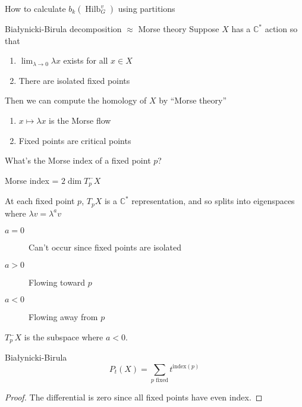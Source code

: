 \documentclass{beamer}
\DeclareMathOperator{\Hilb}{Hilb}
\newcommand{\C}{\mathbb{C}}
\begin{document}
\begin{frame}[plain,c]

\begin{center}

\Huge

How to calculate $b_k(\Hilb^v_G)$ using partitions

\end{center}

\end{frame}





\begin{frame}{Bia\l ynicki-Birula decomposition $\approx$ Morse theory}
Suppose $X$ has a $\C^*$ action so that

\begin{enumerate}
\item $\lim_{\lambda\to 0} \lambda x$ exists for all $x\in X$
\item There are isolated fixed points
\end{enumerate}

Then we can compute the homology of $X$ by ``Morse theory''
\begin{enumerate}
\item $x\mapsto\lambda x$ is the Morse flow
\item Fixed points are critical points
\end{enumerate}

\begin{block}{What's the Morse index of a fixed point $p$?}
\end{block}
\end{frame}



\begin{frame}{Morse index = $2\dim T^-_pX$}

At each fixed point $p$, $T_pX$ is a $\C^*$ representation, and so splits into eigenspaces where $\lambda v=\lambda^a v$

\begin{description}
\item[$a=0$] Can't occur since fixed points are isolated
\item[$a>0$]  Flowing toward $p$
\item [$a<0$] Flowing away from $p$ 
\end{description}
$T^-_pX$ is the subspace where $a<0$.

\begin{Theorem}{Bia\l ynicki-Birula}
$$P_t(X)=\sum_{p\textrm{ fixed}} t^{\textrm{index}(p)}$$
\end{Theorem}
\begin{proof}
The differential is zero since all fixed points have even index.
\end{proof}
\end{frame}
\end{document}
